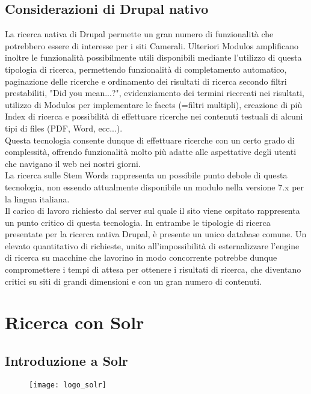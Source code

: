 		\subsection{Considerazioni di Drupal nativo}
		La ricerca nativa di \gls{Drupal} permette un gran numero di funzionalità che potrebbero essere di interesse per i siti Camerali. Ulteriori \glspl{Modulo} amplificano inoltre le funzionalità possibilmente utili disponibili mediante l'utilizzo di questa tipologia di ricerca, permettendo funzionalità di completamento automatico, paginazione delle ricerche e ordinamento dei risultati di ricerca secondo filtri prestabiliti, "Did you mean...?", evidenziamento dei termini ricercati nei risultati, utilizzo di \glspl{Modulo} per implementare le facets (=filtri multipli), creazione di più \gls{Index} di ricerca e possibilità di effettuare ricerche nei contenuti testuali di alcuni tipi di files (PDF, Word, ecc...). \\
		Questa tecnologia consente dunque di effettuare ricerche con un certo grado di complessità, offrendo funzionalità molto più adatte alle aspettative degli utenti che navigano il web nei nostri giorni. \\
		La ricerca sulle \gls{Stem Words} rappresenta un possibile punto debole di questa tecnologia, non essendo attualmente disponibile un modulo nella versione 7.x per la lingua italiana.\\
		Il carico di lavoro richiesto dal server sul quale il sito viene ospitato rappresenta un punto critico di questa tecnologia. In entrambe le tipologie di ricerca presentate per la ricerca nativa \gls{Drupal}, è presente un unico database comune. Un elevato quantitativo di richieste, unito all'impossibilità di esternalizzare l'engine di ricerca su macchine che lavorino in modo concorrente potrebbe dunque compromettere i tempi di attesa per ottenere i risultati di ricerca, che diventano critici su siti di grandi dimensioni e con un gran numero di contenuti.

	\section{Ricerca con Solr}

		\subsection{Introduzione a Solr}
		
		\begin{figure}[htbp]
			\begin{center}
				\texttt{[image: logo\_solr]}
			\end{center}
		\end{figure}
	
